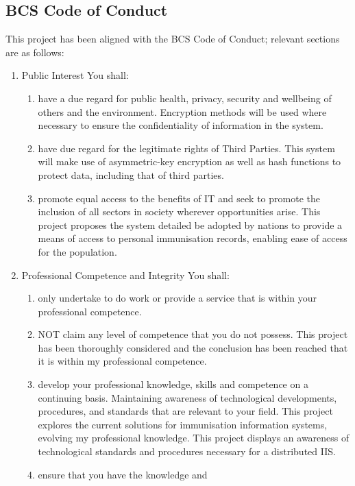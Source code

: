 \documentclass{report}
\begin{document}
\begin{flushleft}
\subsection{BCS Code of Conduct}
This project has been aligned with the BCS Code of Conduct;
relevant sections are as follows:
\renewcommand{\labelenumii}{\alph{enumii}}
 \begin{enumerate}
   \item Public Interest
   You shall:
   \begin{enumerate}
     \item have a due regard for public health, privacy,
     security and wellbeing of others and the environment.
     Encryption methods will be used where necessary to
     ensure the confidentiality of information in the
     system.
     \item have due regard for the legitimate rights of Third
     Parties.
     This system will make use of asymmetric-key
     encryption as well as hash functions to protect data,
     including that of third parties.
     \item promote equal access to the benefits of IT and
     seek to promote the inclusion of all sectors in society
     wherever opportunities arise.
     This project proposes the system detailed be adopted
     by nations to provide a means of access to personal
     immunisation records, enabling ease of access for the
     population.
    \end{enumerate}
   \item Professional Competence and Integrity
   You shall:
   \begin{enumerate}
    \item only undertake to do work or provide a service
    that is within your professional competence.
    \item NOT claim any level of competence that you do
    not possess. This project has been thoroughly considered and the
    conclusion has been reached that it is within my
    professional competence.
    \item develop your professional knowledge, skills and
    competence on a continuing basis. Maintaining
    awareness of technological developments,
    procedures, and standards that are relevant to your
    field.
    This project explores the current solutions for
    immunisation information systems, evolving my
    professional knowledge. This project displays an
    awareness of technological standards and procedures necessary for a distributed IIS.
    \item ensure that you have the knowledge and

\end{enumerate}
\end{enumerate}
\end{flushleft}
\end{document}
